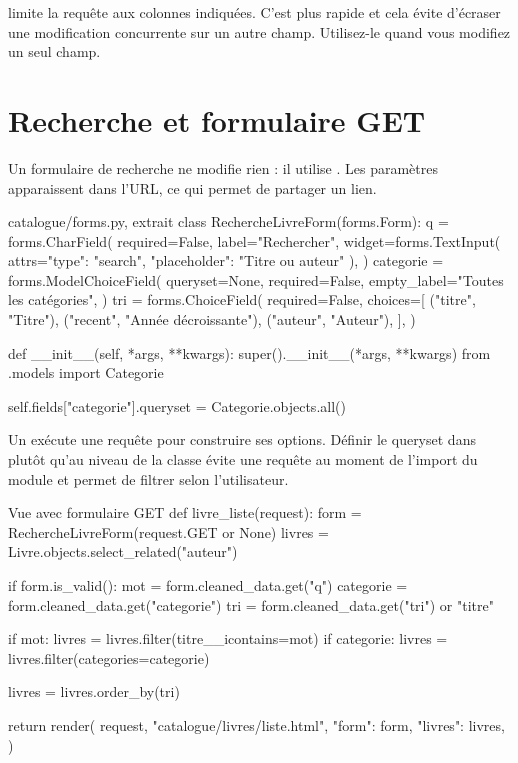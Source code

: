 \begin{note}
 limite la requête  aux colonnes indiquées. C'est
plus rapide et cela évite d'écraser une modification concurrente sur un autre
champ. Utilisez-le quand vous modifiez un seul champ.
\end{note}

\section{Recherche et formulaire GET}

Un formulaire de recherche ne modifie rien : il utilise . Les paramètres
apparaissent dans l'URL, ce qui permet de partager un lien.

\begin{codebox}[python]{catalogue/forms.py, extrait}
class RechercheLivreForm(forms.Form):
    q = forms.CharField(
        required=False,
        label="Rechercher",
        widget=forms.TextInput(
            attrs={"type": "search", "placeholder": "Titre ou auteur"}
        ),
    )
    categorie = forms.ModelChoiceField(
        queryset=None,
        required=False,
        empty_label="Toutes les catégories",
    )
    tri = forms.ChoiceField(
        required=False,
        choices=[
            ("titre", "Titre"),
            ("recent", "Année décroissante"),
            ("auteur", "Auteur"),
        ],
    )

    def __init__(self, *args, **kwargs):
        super().__init__(*args, **kwargs)
        from .models import Categorie

        self.fields["categorie"].queryset = Categorie.objects.all()
\end{codebox}

\begin{attention}
Un  exécute une requête pour construire ses options. Définir
le queryset dans  plutôt qu'au niveau de la classe évite une
requête au moment de l'import du module et permet de filtrer selon l'utilisateur.
\end{attention}

\begin{codebox}[python]{Vue avec formulaire GET}
def livre_liste(request):
    form = RechercheLivreForm(request.GET or None)
    livres = Livre.objects.select_related("auteur")

    if form.is_valid():
        mot = form.cleaned_data.get("q")
        categorie = form.cleaned_data.get("categorie")
        tri = form.cleaned_data.get("tri") or "titre"

        if mot:
            livres = livres.filter(titre__icontains=mot)
        if categorie:
            livres = livres.filter(categories=categorie)

        livres = livres.order_by(tri)

    return render(
        request,
        "catalogue/livres/liste.html",
        {"form": form, "livres": livres},
    )
\end{codebox}

